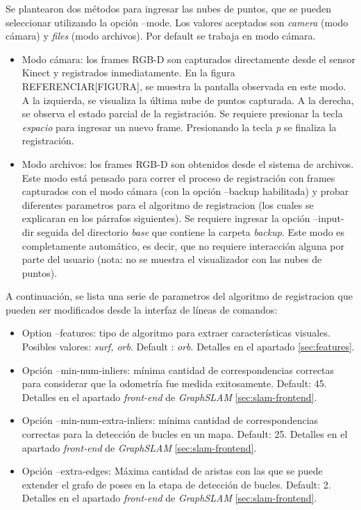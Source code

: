 Se plantearon dos métodos para ingresar las nubes de puntos, que se pueden seleccionar utilizando la opción --mode.
Los valores aceptados son \textsl{camera} (modo cámara) y \textsl{files} (modo archivos). Por default se trabaja en modo cámara.
\begin{itemize}

\item Modo cámara: los frames RGB-D son capturados directamente desde el sensor Kinect y registrados inmediatamente. En la figura REFERENCIAR[FIGURA], se muestra la pantalla observada en este modo. A la izquierda, se visualiza la última nube de puntos capturada. A la derecha, se observa el estado parcial de la registración. Se requiere presionar la tecla \textit{espacio} para ingresar un nuevo frame. Presionando la tecla \textit{p} se finaliza la registración.

\item Modo archivos: los frames RGB-D son obtenidos desde el sistema de archivos. Este modo está pensado para correr el proceso de registración con frames capturados con el modo cámara (con la opción --backup habilitada) y probar diferentes parametros para el algoritmo de registracion (los cuales se explicaran en los párrafos siguientes). Se requiere ingresar la opción --input-dir seguida del directorio \textit{base} que contiene la carpeta \textit{backup}. Este modo es completamente automático, es decir, que no requiere interacción alguna por parte del usuario (nota: no se muestra el visualizador con las nubes de puntos).

\end{itemize}

A continuación, se lista una serie de parametros del algoritmo de registracion que pueden ser modificados desde la interfaz de líneas de comandos:

\begin{itemize}

\item Option --features: tipo de algoritmo para extraer características visuales. Posibles valores: \textsl{surf, orb}. Default : \textsl{orb}. Detalles en el apartado \ref{sec:features}.

\item Opción --min-num-inliers: mínima cantidad de correspondencias correctas para considerar que la odometría fue medida exitosamente. Default: 45. Detalles en el apartado \textit{front-end} de \textit{GraphSLAM} \ref{sec:slam-frontend}.	

\item Opción --min-num-extra-inliers: mínima cantidad de correspondencias correctas para la detección de bucles en un mapa. Default: 25. Detalles en el apartado \textit{front-end} de \textit{GraphSLAM} \ref{sec:slam-frontend}.

\item Opción --extra-edges: Máxima cantidad de aristas con las que se puede extender el grafo de poses en la etapa de detección de bucles. Default: 2. Detalles en el apartado \textit{front-end} de \textit{GraphSLAM} \ref{sec:slam-frontend}.

\end{itemize}

